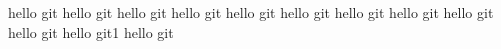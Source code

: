 hello git
hello git
hello git
hello git
hello git
hello git
hello git
hello git
hello git
hello git
hello git1
hello git
